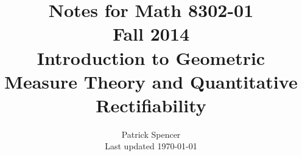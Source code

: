 \documentclass[12pt,makeidx]{amsbook}
\begin{document}
\title{Notes for Math 8302-01 \\ Fall 2014 \\ Introduction to
Geometric Measure Theory and Quantitative Rectifiability}
\author{Patrick Spencer \\ Last updated \today}

\maketitle
\tableofcontents




\printindex
\printglossaries



\end{document}
